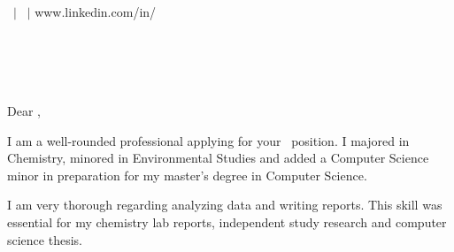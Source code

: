 \documentclass[10pt]{letter}
\date{}
\def\headingcolor{\color{ProcessBlue}}
\begin{document}
\begin{letter}{}
\begin{center}
\Huge
\textbf{\headingcolor{\Name\postNm
}}
	
	
	\large{
		\Phone \ $|$ \Email \ $|$ 
		www.linkedin.com/in/\Usrnm \\  
		\Postitle \\
	}
\headingcolor{\rule{\linewidth}{1pt}} \normalsize
\end{center}

\begin{flushleft}
\opening{} %
\vspace{-30pt}
\Manager
\ \\
\EmployerAddr
\ \\
\ \\
Dear \Manager,

\par{
I am a well-rounded professional applying for your \Postitle \ position. I majored in Chemistry, minored in Environmental Studies and added a Computer Science minor in preparation for my master's degree in Computer Science.} %
\par{
I am very thorough regarding analyzing data and writing reports. This skill was essential for my chemistry lab reports, independent study research and computer science thesis.	
}



\end{flushleft}
\end{letter}
\end{document}
